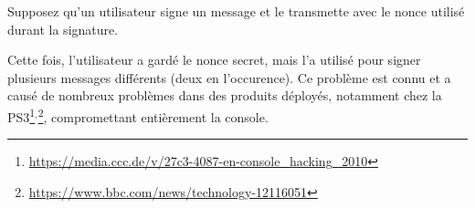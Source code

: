 \documentclass[french,a4paper,11pt]{exam}
\begin{document}
\begin{questions}
  \question Supposez qu'un utilisateur signe un message et le transmette avec le nonce utilisé durant la signature.
  
  \question Cette fois, l'utilisateur a gardé le nonce secret, mais l'a utilisé pour signer plusieurs messages différents (deux en l'occurence). Ce problème est connu et a causé de nombreux problèmes dans des produits déployés, notamment chez la PS3\footnote{\url{https://media.ccc.de/v/27c3-4087-en-console_hacking_2010}}$^, $\footnote{\url{https://www.bbc.com/news/technology-12116051}}, compromettant entièrement la console.
  
\end{questions}
\end{document}
